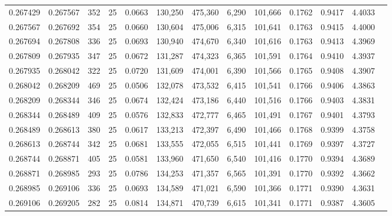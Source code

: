 \begin{tabular}{rrrrrrrrrrrrr}
0.267429 & 0.267567 &   352 &  25 &                                     0.0663 & 130,250 & 475,360 &   6,290 & 101,666 & 0.1762 & 0.9417 & 4.4033 \\
0.267567 & 0.267692 &   354 &  25 &                                     0.0660 & 130,604 & 475,006 &   6,315 & 101,641 & 0.1763 & 0.9415 & 4.4000 \\
0.267694 & 0.267808 &   336 &  25 &                                     0.0693 & 130,940 & 474,670 &   6,340 & 101,616 & 0.1763 & 0.9413 & 4.3969 \\
0.267809 & 0.267935 &   347 &  25 &                                     0.0672 & 131,287 & 474,323 &   6,365 & 101,591 & 0.1764 & 0.9410 & 4.3937 \\
0.267935 & 0.268042 &   322 &  25 &                                     0.0720 & 131,609 & 474,001 &   6,390 & 101,566 & 0.1765 & 0.9408 & 4.3907 \\
0.268042 & 0.268209 &   469 &  25 &                                     0.0506 & 132,078 & 473,532 &   6,415 & 101,541 & 0.1766 & 0.9406 & 4.3863 \\
0.268209 & 0.268344 &   346 &  25 &                                     0.0674 & 132,424 & 473,186 &   6,440 & 101,516 & 0.1766 & 0.9403 & 4.3831 \\
0.268344 & 0.268489 &   409 &  25 &                                     0.0576 & 132,833 & 472,777 &   6,465 & 101,491 & 0.1767 & 0.9401 & 4.3793 \\
0.268489 & 0.268613 &   380 &  25 &                                     0.0617 & 133,213 & 472,397 &   6,490 & 101,466 & 0.1768 & 0.9399 & 4.3758 \\
0.268613 & 0.268744 &   342 &  25 &                                     0.0681 & 133,555 & 472,055 &   6,515 & 101,441 & 0.1769 & 0.9397 & 4.3727 \\
0.268744 & 0.268871 &   405 &  25 &                                     0.0581 & 133,960 & 471,650 &   6,540 & 101,416 & 0.1770 & 0.9394 & 4.3689 \\
0.268871 & 0.268985 &   293 &  25 &                                     0.0786 & 134,253 & 471,357 &   6,565 & 101,391 & 0.1770 & 0.9392 & 4.3662 \\
0.268985 & 0.269106 &   336 &  25 &                                     0.0693 & 134,589 & 471,021 &   6,590 & 101,366 & 0.1771 & 0.9390 & 4.3631 \\
0.269106 & 0.269205 &   282 &  25 &                                     0.0814 & 134,871 & 470,739 &   6,615 & 101,341 & 0.1771 & 0.9387 & 4.3605 \\

\end{tabular}

